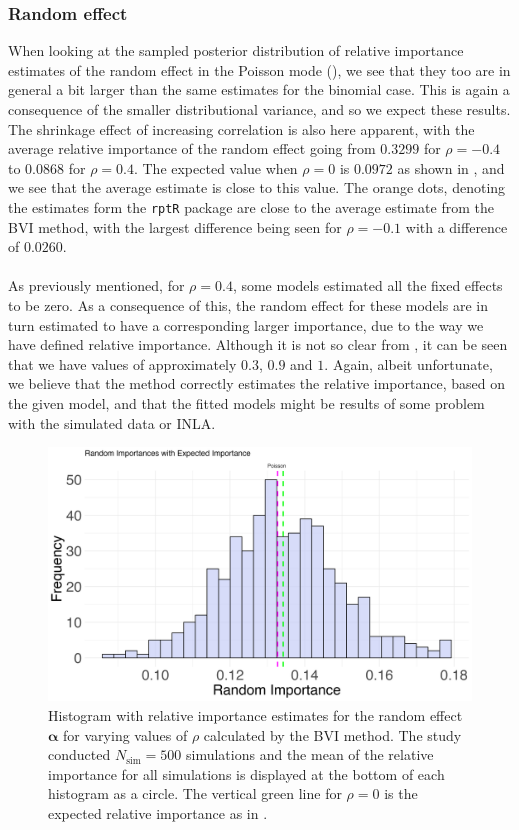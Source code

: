 \subsubsection{Random effect}
When looking at the sampled posterior distribution of relative importance estimates of the random effect in the Poisson mode (), we see that they too are in general a bit larger than the same estimates for the binomial case. This is again a consequence of the smaller distributional variance, and so we expect these results. The shrinkage effect of increasing correlation is also here apparent, with the average relative importance of the random effect going from $0.3299$ for $\rho=-0.4$ to $0.0868$ for $\rho=0.4$. The expected value when $\rho=0$ is $0.0972$ as shown in , and we see that the average estimate is close to this value. The orange dots, denoting the estimates form the \texttt{rptR} package are close to the average estimate from the BVI method, with the largest difference being seen for $\rho=-0.1$ with a difference of $0.0260$.
\\
\\
As previously mentioned, for $\rho=0.4$, some models estimated all the fixed effects to be zero. As a consequence of this, the random effect for these models are in turn estimated to have a corresponding larger importance,  due to the way we have defined relative importance. Although it is not so clear from , it can be seen that we have values of approximately $0.3$, $0.9$ and $1$. Again, albeit unfortunate, we believe that the method correctly estimates the relative importance, based on the given model, and that the fitted models might be results of some problem with the simulated data or INLA.
\begin{figure}[H]
  \centering
    \includegraphics[width=1\linewidth]{Figures/Simulation study/Random_poisson.png}
    \caption{Histogram with relative importance estimates for the random effect $\boldsymbol{\alpha}$ for varying values of $\rho$ calculated by the BVI method. The study conducted $N_{\text{sim}}=500$ simulations and the mean of the relative importance for all simulations is displayed at the bottom of each histogram as a circle. The vertical green line for $\rho=0$ is the expected relative importance as in .}
    \label{fig:relimp_random_poisson}
\end{figure}
